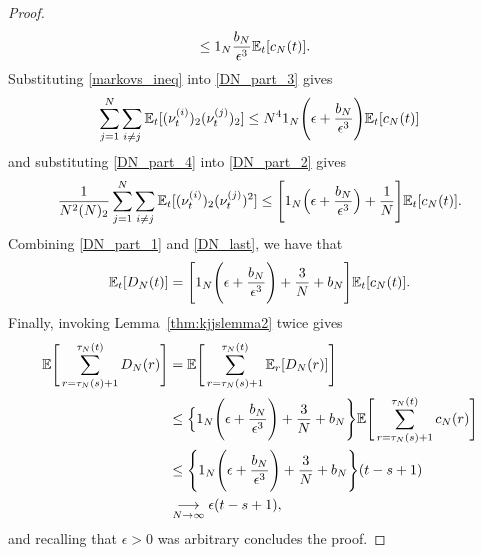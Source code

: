 \begin{proof}
\begin{align}
&\leq 1_N \frac{ b_N }{ \epsilon^3 } \mathbb{E}_t[ c_N( t )] . 
\end{align}
Substituting \eqref{markovs_ineq} into \eqref{DN_part_3} gives
\begin{equation}
\sum_{ j=1 }^N \sum_{ i \neq j } \mathbb{E}_t[ ( \nu_t^{(i)} )_2 ( \nu_t^{(j)} )_2 ]
\leq N^4 1_N
        \Bigg( \epsilon + \frac{ b_N }{ \epsilon^3 } \Bigg) \mathbb{E}_t[ c_N( t ) ] \label{DN_part_4}
\end{equation}
and substituting \eqref{DN_part_4} into \eqref{DN_part_2} gives
\begin{equation}
\frac{ 1 }{ N^2 ( N )_2 } \sum_{ j=1 }^N \sum_{ i \neq j } 
        \mathbb{E}_t[ ( \nu_t^{(i)} )_2 ( \nu_t^{(j)} )^2 ] 
\leq \Bigg[ 1_N
        \Big( \epsilon + \frac{ b_N }{ \epsilon^3 } \Big) 
        + \frac{ 1 }{ N } \Bigg] \mathbb{E}_t[ c_N( t ) ]. \label{DN_last}
\end{equation}
Combining \eqref{DN_part_1} and \eqref{DN_last}, we have that
\begin{equation*}
\mathbb{E}_t[ D_N(t) ] 
= \Bigg[ 1_N \Bigg( \epsilon + \frac{ b_N }{ \epsilon^3 } \Bigg) 
        + \frac{ 3 }{ N } + b_N \Bigg] \mathbb{E}_t[ c_N(t) ] .
\end{equation*}
Finally, invoking Lemma~\ref{thm:kjjslemma2} twice gives
\begin{align*}
\mathbb{E}\Bigg[ \sum_{ r = \tau_N( s ) + 1 }^{ \tau_N( t ) } D_N( r ) \Bigg] 
&= \mathbb{E}\Bigg[ \sum_{ r = \tau_N( s ) + 1 }^{ \tau_N( t ) } \mathbb{E}_r[ D_N( r ) ] \Bigg] \\
&\leq \Big\{ 1_N
        \Bigg( \epsilon + \frac{ b_N }{ \epsilon^3 } \Bigg) 
        + \frac{ 3 }{ N } + b_N \Bigg\}
        \mathbb{E}\Bigg[ \sum_{ r = \tau_N( s ) + 1 }^{ \tau_N( t ) } c_N( r ) \Bigg] \\
&\leq \Bigg\{ 1_N
        \Bigg( \epsilon + \frac{ b_N }{ \epsilon^3 } \Bigg) 
        + \frac{ 3 }{ N } + b_N \Bigg\} ( t - s + 1 ) \\
& \underset{N\to\infty}{\longrightarrow} \epsilon ( t - s + 1 ),
\end{align*}
and recalling that $\epsilon > 0$ was arbitrary concludes the proof.
\end{proof}





